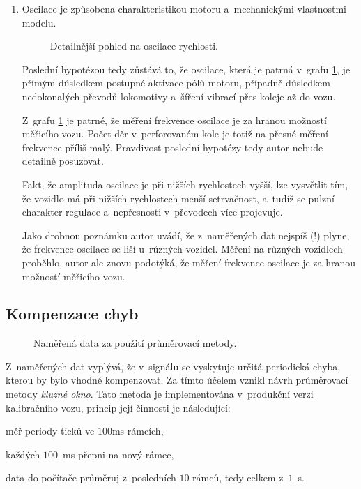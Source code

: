 \begin{enumerate}
\item Oscilace je způsobena charakteristikou motoru a~mechanickými vlastnostmi
modelu.

\begin{figure}[ht]

\caption{Detailnější pohled na oscilace rychlosti.}
\label{fig:speed-presny}
\end{figure}

Poslední hypotézou tedy zůstává to, že oscilace, která je patrná v~grafu
\ref{fig:speed-presny}, je přímým důsledkem postupné aktivace pólů motoru,
případně důsledkem nedokonalých převodů lokomotivy a~šíření vibrací přes koleje
až do vozu.

Z~grafu \ref{fig:speed-presny} je patrné, že měření frekvence oscilace je za
hranou možností měřicího vozu. Počet děr v~perforovaném kole je totiž na přesné
měření frekvence příliš malý. Pravdivost poslední hypotézy tedy autor nebude
detailně posuzovat.

Fakt, že amplituda oscilace je při nižších rychlostech vyšší, lze vysvětlit
tím, že vozidlo má při nižších rychlostech menší setrvačnost, a~tudíž se pulzní
charakter regulace a~nepřesnosti v~převodech více projevuje.

Jako drobnou poznámku autor uvádí, že z~naměřených dat nejspíš (!) plyne,
že frekvence oscilace se liší u~různých vozidel. Měření na různých vozidlech
proběhlo, autor ale znovu podotýká, že měření frekvence oscilace je za hranou
možností měřicího vozu.

\end{enumerate}

\subsection{Kompenzace chyb}
\label{subsec:wsm-kompenzace}

\begin{figure}[ht]

\caption{Naměřená data za použití průměrovací metody.}
\label{fig:prumer}
\end{figure}

Z~naměřených dat vyplývá, že v~signálu se vyskytuje určitá periodická chyba,
kterou by bylo vhodné kompenzovat. Za tímto účelem vznikl návrh průměrovací
metody \textit{kluzné okno}. Tato metoda je implementována v~produkční verzi
kalibračního vozu, princip její činnosti je následující:

\begin{compactenum}
\item měř periody ticků ve $100$ms rámcích,
\item každých $100$~ms přepni na nový rámec,
\item data do počítače průměruj z~posledních $10$ rámců, tedy celkem z~$1$~s.
\end{compactenum}


